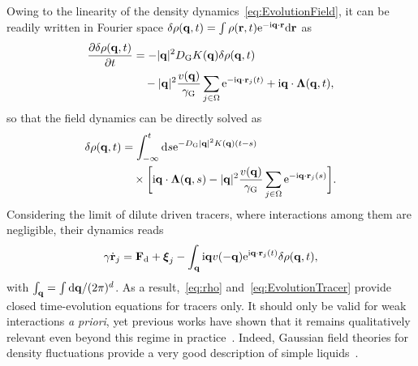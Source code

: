 \documentclass[superscriptaddress, twocolumn, prx, longbibliography, nofootinbib]{revtex4-1}
\newcommand{\dd}{\text{d}}
\newcommand{\ee}{\text{e}}
\newcommand{\ii}{\text{i}}
\begin{document}
Owing to the linearity of the density dynamics~\eqref{eq:EvolutionField}, it can be readily written in Fourier space $\delta\rho({\bf q},t)=\int\rho({\bf r},t){\rm e}^{-{\rm i}{\bf q}\cdot{\bf r}} {\rm d}{\bf r}$ as
\begin{equation}\label{eq:FourierEvolutionField}
	\begin{aligned}
		\frac{\partial \delta \rho({\bf q},t)}{\partial t} &= - |{\bf q}|^2 D_{\rm G} K({\bf q}) \delta \rho({\bf q},t)
		\\
		&\quad - |{\bf q}|^2 \frac{v({\bf q})}{\gamma_{\rm G}} \sum_{j\in\Omega}\ee^{-\ii {\bf q} \cdot {\bf r}_j(t)} + \ii{\bf q}\cdot{\boldsymbol\Lambda} ({\bf q},t) ,
	\end{aligned}
\end{equation}
so that the field dynamics can be directly solved as
\begin{equation}\label{eq:rho}
	\begin{aligned}
		\delta\rho({\bf q},t) &= \int_{-\infty}^t \dd s \ee^{-D_{\rm G} |{\bf q}|^2 K({\bf q})(t-s)}
		\\
		&\quad\times \bigg[ \ii{\bf q} \cdot {\boldsymbol\Lambda}({\bf q},s) - |{\bf q}|^2 \frac{v({\bf q})}{\gamma_{\rm G}} \sum_{j\in\Omega}\ee^{-\ii {\bf q}\cdot {\bf r}_j(s)}\bigg] .
	\end{aligned}
\end{equation}
Considering the limit of dilute driven tracers, where interactions among them are negligible, their dynamics reads
\begin{equation}\label{eq:EvolutionTracer}
	\gamma\dot{\bf r}_j = {\bf F}_\text{d} + {\boldsymbol\xi_j} - \int_{\bf q} \ii{\bf q} v(-{\bf q})\ee^{\ii{\bf q} \cdot {\bf r}_j(t)} \delta \rho({\bf q}, t) ,
\end{equation}
with $\int_{\bf q}=\int\dd{\bf q}/(2\pi)^d$. As a result,~\eqref{eq:rho} and~\eqref{eq:EvolutionTracer} provide closed time-evolution equations for tracers only. It should only be valid for weak interactions {\it a priori}, yet previous works have shown that it remains qualitatively relevant even beyond this regime in practice~\cite{Demery2015, Martin2018, Demery2019}. Indeed, Gaussian field theories for density fluctuations provide a very good description of simple liquids~\cite{Chandler1993}.
\end{document}
